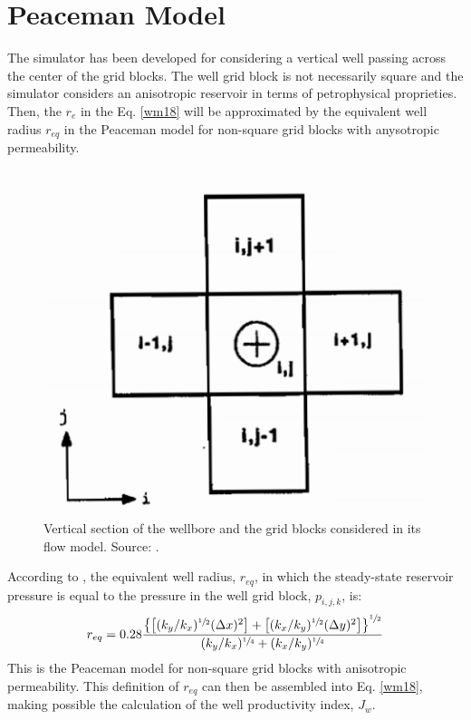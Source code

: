 \section{Peaceman Model}
The simulator has been developed for considering a vertical well passing across the center of the grid blocks. The well grid block is not necessarily square and the simulator considers an anisotropic reservoir in terms of petrophysical proprieties. Then, the $r_e$ in the Eq. \ref{wm18} will be approximated by the equivalent well radius $r_{eq}$ in the Peaceman model for non-square grid blocks with anysotropic permeability.
\begin{figure}[h]
	\centering
	\includegraphics[width=0.5\linewidth]{Images/23}
	\caption{Vertical section of the wellbore and the grid blocks considered in its flow model. Source: \cite{Ertekin2001}.}
	\label{fig:23}
\end{figure}
According to \cite{Ertekin2001}, the equivalent well radius, $r_{eq}$, in which the steady-state reservoir pressure is equal to the pressure in the well grid block, $p_{i,j,k}$, is:
\begin{equation}
\label{wm19}
r_{eq} = 0.28 \frac{ \left\lbrace \left[ (k_y/k_x)^{\sfrac{1}{2}} (\Delta x)^2 \right] + \left[ (k_x/k_y)^{\sfrac{1}{2}} (\Delta y)^2 \right]\right\rbrace^{\sfrac{1}{2}}}{ (k_y/k_x)^{\sfrac{1}{4}} + (k_x/k_y)^{\sfrac{1}{4}}}
\end{equation}
This is the Peaceman model for non-square grid blocks with anisotropic permeability. This definition of $r_{eq}$ can then be assembled into Eq. \ref{wm18}, making possible the calculation of the well productivity index, $J_w$.

